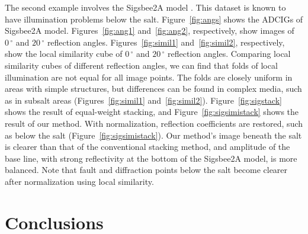


The second example involves the Sigsbee2A model \cite[]{Paffenholz}. This dataset is known to have illumination problems below the salt. Figure~\ref{fig:angs} shows the ADCIGs of Sigsbee2A model. Figures~\ref{fig:ang1} and~\ref{fig:ang2}, respectively, show images of $0\,^{\circ}$ and $20\,^{\circ}$  reflection angles. Figures~\ref{fig:simil1} and~\ref{fig:simil2}, respectively, show the local similarity cube of $0\,^{\circ}$ and $20\,^{\circ}$ reflection angles. Comparing local similarity cubes of different reflection angles, we can find that folds of local illumination are not equal for all image points. The folds are closely uniform in areas with simple structures, but differences can be found in complex media, such as in subsalt areas (Figures~\ref{fig:simil1} and~\ref{fig:simil2}). Figure~\ref{fig:sigstack} shows the result of equal-weight stacking, and Figure~\ref{fig:sigsimistack} shows the result of our method. With normalization, reflection coefficients are restored, such as below the salt (Figure~\ref{fig:sigsimistack}). Our method's image beneath the salt is clearer than that of the conventional stacking method, and amplitude of the base line, with strong reflectivity at the bottom of the Sigsbee2A model, is more balanced. Note that fault and diffraction points below the salt become clearer after normalization using local similarity.




\section{Conclusions}

